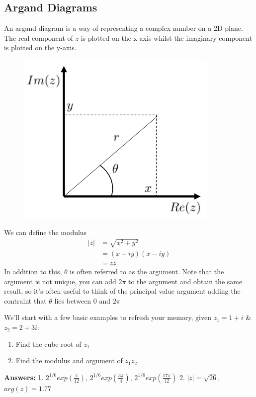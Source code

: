 \subsection{Argand Diagrams}
An argand diagram is a way of representing a complex number on a 2D plane.
 The real component of $z$ is plotted on the x-axis whilst the imaginary component is plotted on the y-axis.
%
\begin{minipage}[t]{0.47\linewidth}
	\begin{figure}[H]
 		\centering
 		\includegraphics[width=\linewidth]{complex/argand}
 		\captionsetup{font=small} 	
	\end{figure} 
\end{minipage}
\hspace{0.6cm}
%
\begin{minipage}[t]{0.47\linewidth}
	\vspace{1cm}
	We can define the modulus 
	\begin{align*}
	|z| &= \sqrt{x^2+y^2} \\
	&= (x+iy)(x-iy) \\
	&= z\overline{z}.
	\end{align*}
	In addition to this, $\theta$ is often referred to as the argument.
	 Note that the argument is not unique, you can add $2\pi$ to the argument and obtain the same result, so it's often useful to think of the principal value argument adding the contraint that $\theta$ lies between $0$ and $2\pi$
\end{minipage}
%
\begin{examples}
	We'll start with a few basic examples to refresh your memory, given $z_1=1+i$ \& $z_2=2+3i$:
	\begin{enumerate}
		\item Find the cube root of $z_1$
		\item Find the modulus and argument of $z_1z_2$
	\end{enumerate}
\textbf{Answers:} 1. $2^{1/6}exp(\frac{\pi}{12})$, $2^{1/6}exp(\frac{3\pi}{4})$, $2^{1/6}exp(\frac{17\pi}{12})$ \hspace{0.5cm}
2. $|z| = \sqrt{26}$, $arg(z)=1.77$
\end{examples}
%
